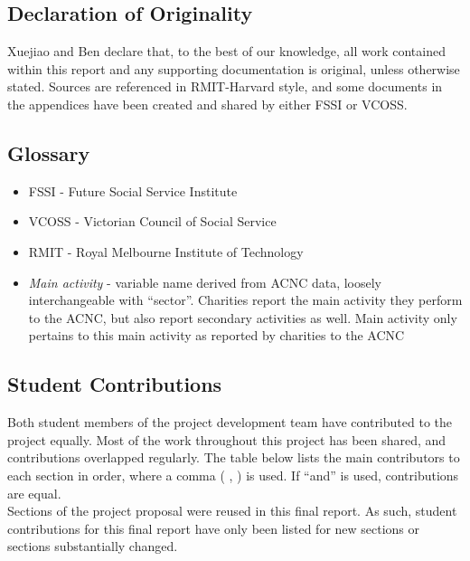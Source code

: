 \documentclass[
  11pt,
]{article}
\providecommand{\tightlist}{%
  \setlength{\itemsep}{0pt}\setlength{\parskip}{0pt}}
\begin{document}
\hypertarget{declaration-of-originality}{%
\subsection*{Declaration of Originality}\label{declaration-of-originality}}

Xuejiao and Ben declare that, to the best of our knowledge, all work contained within this report and any supporting documentation is original, unless otherwise stated. Sources are referenced in RMIT-Harvard style, and some documents in the appendices have been created and shared by either FSSI or VCOSS.

\hypertarget{glossary}{%
\subsection*{Glossary}\label{glossary}}

\begin{itemize}
\tightlist
\item
  FSSI - Future Social Service Institute
\item
  VCOSS - Victorian Council of Social Service
\item
  RMIT - Royal Melbourne Institute of Technology
\item
  \emph{Main activity} - variable name derived from ACNC data, loosely interchangeable with ``sector''. Charities report the main activity they perform to the ACNC, but also report secondary activities as well. Main activity only pertains to this main activity as reported by charities to the ACNC
\end{itemize}

\newpage

\hypertarget{student-contributions}{%
\subsection*{Student Contributions}\label{student-contributions}}

Both student members of the project development team have contributed to the project equally. Most of the work throughout this project has been shared, and contributions overlapped regularly. The table below lists the main contributors to each section in order, where a comma ( , ) is used. If ``and'' is used, contributions are equal.\\
Sections of the project proposal were reused in this final report. As such, student contributions for this final report have only been listed for new sections or sections substantially changed.
\end{document}
